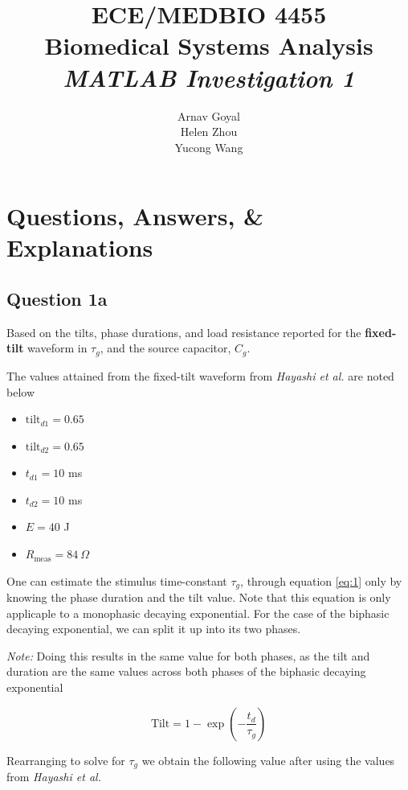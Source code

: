 \documentclass[]{report}
\title{\textbf{ECE/MEDBIO 4455} \\ Biomedical Systems Analysis \\ \textit{MATLAB Investigation 1}}
\author{Arnav Goyal  \\ Helen Zhou  \\ Yucong Wang }
\begin{document}
\maketitle
\newpage
\tableofcontents
\newpage

\chapter*{Questions, Answers, \& Explanations}

\section*{Question 1a}

Based on the tilts, phase durations, and load resistance reported for the \textbf{fixed-tilt} waveform in $\tau_g$, and the source 
capacitor, $C_g$.


The values attained from the fixed-tilt waveform from \textit{Hayashi et al.} are noted below

\begin{itemize}
 	\item $\text{tilt}_{d1}  = 0.65$ 
 	\item $\text{tilt}_{d2}  = 0.65$
	\item $t_{d1} = 10$ ms
	\item $t_{d2} = 10$ ms
	\item $E        = 40$ J
	\item $R_\text{meas}   = 84 \ \Omega$
\end{itemize}
 
One can estimate the stimulus time-constant $\tau_g$, through equation \ref{eq:1} only by knowing the phase duration and the tilt value. Note that this equation is only applicaple to a monophasic decaying exponential. For the case of the biphasic decaying exponential, we can split it up into its two phases.

\textit{Note:} Doing this results in the same value for both phases, as the tilt and duration are the same values across both phases of the biphasic decaying exponential

\begin{equation}
\label{eq:1}
	\text{Tilt} = 1 - \exp{\left( - \frac{t_d}{\tau_g} \right)}
\end{equation}

Rearranging to solve for $\tau_g$ we obtain  the following value after using the values from \textit{Hayashi et al.}
\end{document}
